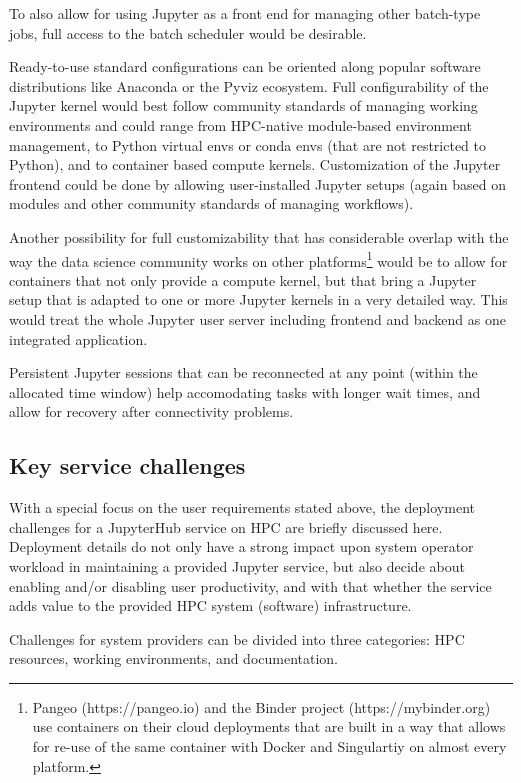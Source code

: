 To also allow for using Jupyter as a front end for managing other batch-type jobs, full access to the batch scheduler would be desirable.

Ready-to-use standard configurations can be oriented along popular software distributions like Anaconda or the Pyviz ecosystem. 
Full configurability of the Jupyter kernel would best follow community standards of managing working environments and could range from HPC-native module-based environment management, to Python virtual envs or conda envs (that are not restricted to Python), and to container based compute kernels.
Customization of the Jupyter frontend could be done by allowing user-installed Jupyter setups (again based on modules and other community standards of managing workflows).

Another possibility for full customizability that has considerable overlap with the way the data science community works on other platforms\footnote{Pangeo (https://pangeo.io) and the Binder project (https://mybinder.org) use containers on their cloud deployments that are built in a way that allows for re-use of the same container with Docker and Singulartiy on almost every platform.} would be to allow for containers that not only provide a compute kernel, but that bring a Jupyter setup that is adapted to one or more Jupyter kernels in a very detailed way.
This would treat the whole Jupyter user server including frontend and backend as one integrated application.

Persistent Jupyter sessions that can be reconnected at any point (within the allocated time window) help accomodating tasks with longer wait times, and allow for recovery after connectivity problems.


\subsection{Key service challenges}

With a special focus on the user requirements stated above, the deployment challenges for a JupyterHub service on HPC are briefly discussed here.
Deployment details do not only have a strong impact upon system operator workload in maintaining a provided Jupyter service, but also decide about enabling and/or disabling user productivity, and with that whether the service adds value to the provided HPC system (software) infrastructure.

Challenges for system providers can be divided into three categories: HPC resources, working environments, and documentation.

